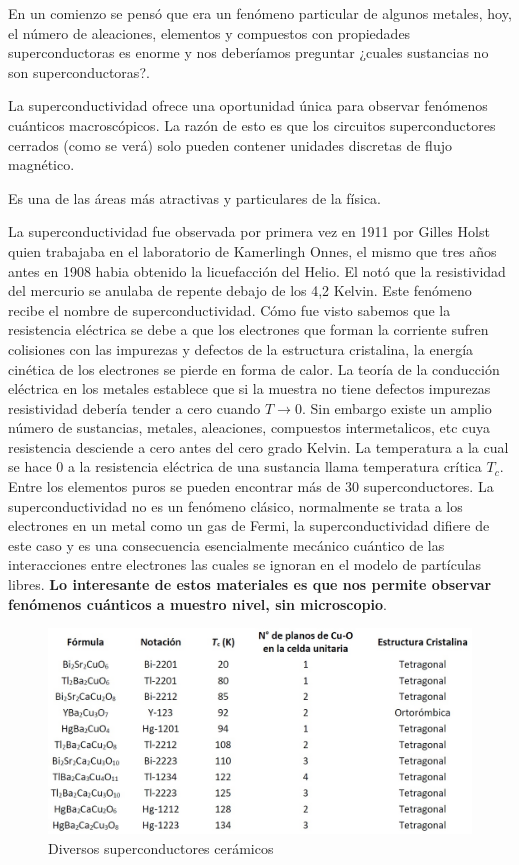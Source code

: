 En un comienzo se pensó que era un fenómeno particular de algunos metales, hoy, el número de aleaciones, elementos y compuestos con propiedades superconductoras es enorme y nos deberíamos preguntar ¿cuales sustancias no son superconductoras?.

La superconductividad ofrece una oportunidad única para observar fenómenos cuánticos macroscópicos. La razón de esto es que los circuitos superconductores cerrados (como se verá) solo pueden contener unidades discretas de flujo magnético.

Es una de las áreas más atractivas y particulares de la física.

La superconductividad fue observada por primera vez en 1911 por Gilles Holst quien trabajaba en el laboratorio de Kamerlingh Onnes, el mismo que tres años antes en 1908 habia obtenido la licuefacción del Helio. El notó que la resistividad del mercurio se anulaba de repente debajo de los 4,2 Kelvin. Este fenómeno recibe el nombre de superconductividad. Cómo fue visto sabemos que la resistencia eléctrica se debe a que los electrones que forman la corriente sufren colisiones con las impurezas y defectos de la estructura cristalina, la energía cinética de los electrones se pierde en forma de calor. La teoría de la conducción eléctrica en los metales establece que si la muestra no tiene defectos impurezas resistividad debería tender a cero cuando $T\rightarrow 0$. Sin embargo existe un amplio número de sustancias, metales, aleaciones, compuestos intermetalicos, etc cuya resistencia desciende a cero antes del cero grado Kelvin. La temperatura a la cual se hace 0 a la resistencia eléctrica de una sustancia llama temperatura crítica $T_{c}$. Entre los elementos puros se pueden encontrar más de 30 superconductores. La superconductividad no es un fenómeno clásico, normalmente se trata a los electrones en un metal como un gas de Fermi, la superconductividad difiere de este caso y es una consecuencia esencialmente mecánico cuántico de las interacciones entre electrones las cuales se ignoran en el modelo de partículas libres. \textbf{Lo interesante de estos materiales es que nos permite observar fenómenos cuánticos a muestro nivel, sin microscopio}.

\begin{figure}[H]
    \centering
    \includegraphics[width=1.0\textwidth]{./Figures/fig48}
	\caption{Diversos superconductores cerámicos}
	\label{fig:48}
\end{figure}



